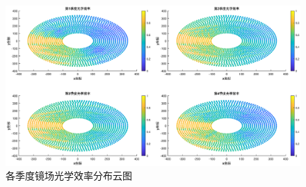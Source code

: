 \documentclass[withoutpreface,bwprint]{cumcmthesis} %
\begin{document}
\begin{figure}[H]
\centering
\includegraphics[height=.56\textwidth]{figures/热力图.eps}
\caption{各季度镜场光学效率分布云图}\label{a3}
\end{figure}
\end{document}
